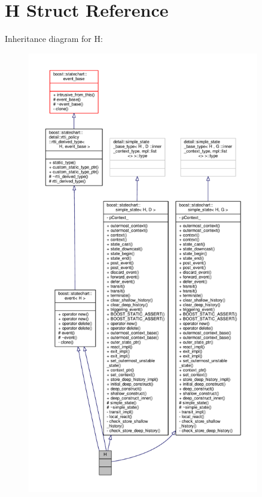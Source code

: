 \hypertarget{struct_h}{}\section{H Struct Reference}
\label{struct_h}


Inheritance diagram for H\+:
\nopagebreak
\begin{figure}[H]
\begin{center}
\leavevmode
\includegraphics[height=550pt]{struct_h__inherit__graph}
\end{center}
\end{figure}


